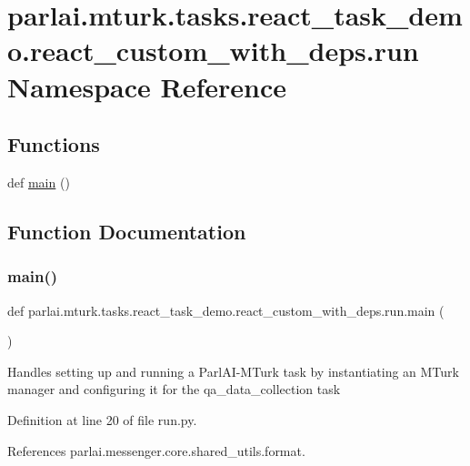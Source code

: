 \hypertarget{namespaceparlai_1_1mturk_1_1tasks_1_1react__task__demo_1_1react__custom__with__deps_1_1run}{}\section{parlai.\+mturk.\+tasks.\+react\+\_\+task\+\_\+demo.\+react\+\_\+custom\+\_\+with\+\_\+deps.\+run Namespace Reference}
\label{namespaceparlai_1_1mturk_1_1tasks_1_1react__task__demo_1_1react__custom__with__deps_1_1run}
\subsection*{Functions}
\begin{DoxyCompactItemize}
\item 
def \hyperlink{namespaceparlai_1_1mturk_1_1tasks_1_1react__task__demo_1_1react__custom__with__deps_1_1run_a50f23070329d468b1499c88037338007}{main} ()
\end{DoxyCompactItemize}


\subsection{Function Documentation}
\mbox{\label{namespaceparlai_1_1mturk_1_1tasks_1_1react__task__demo_1_1react__custom__with__deps_1_1run_a50f23070329d468b1499c88037338007}} 
\subsubsection{\texorpdfstring{main()}{main()}}
{\footnotesize\ttfamily def parlai.\+mturk.\+tasks.\+react\+\_\+task\+\_\+demo.\+react\+\_\+custom\+\_\+with\+\_\+deps.\+run.\+main (\begin{DoxyParamCaption}{ }\end{DoxyParamCaption})}

\begin{DoxyVerb}Handles setting up and running a ParlAI-MTurk task by instantiating
an MTurk manager and configuring it for the qa_data_collection task
\end{DoxyVerb}
 

Definition at line 20 of file run.\+py.



References parlai.\+messenger.\+core.\+shared\+\_\+utils.\+format.

